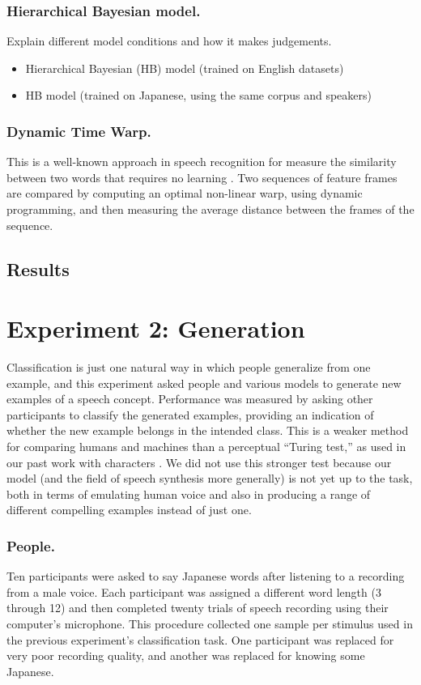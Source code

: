 \documentclass[10pt,letterpaper]{article}
\begin{document}
\subsubsection{Hierarchical Bayesian model.}

Explain different model conditions and how it makes judgements.
\begin{itemize}
	\item Hierarchical Bayesian (HB) model (trained on English datasets)
	\item HB model (trained on Japanese, using the same corpus and speakers)
\end{itemize}

\subsubsection{Dynamic Time Warp.} 
This is a well-known approach in speech recognition for measure the similarity between two words that requires no learning \cite{Sakoe1978}. Two sequences of feature frames are compared by computing an optimal non-linear warp, using dynamic programming, and then measuring the average distance between the frames of the sequence. 

\subsection{Results}

\section{Experiment 2: Generation}
Classification is just one natural way in which people generalize from one example, and this experiment asked people and various models to generate new examples of a speech concept. Performance was measured by asking other participants to classify the generated examples, providing an indication of whether the new example belongs in the intended class. This is a weaker method for comparing humans and machines than a perceptual ``Turing test,'' as used in our past work with characters \cite{Lake2013}. We did not use this stronger test because our model (and the field of speech synthesis more generally) is not yet up to the task, both in terms of emulating human voice and also in producing a range of different compelling examples instead of just one.

 \subsubsection{People.} Ten participants were asked to say Japanese words after listening to a recording from a male voice. Each participant was assigned a different word length (3 through 12) and then completed twenty trials of speech recording using their computer's microphone. This procedure collected one sample per stimulus used in the previous experiment's classification task. One participant was replaced for very poor recording quality, and another was replaced for knowing some Japanese.
\end{document}
